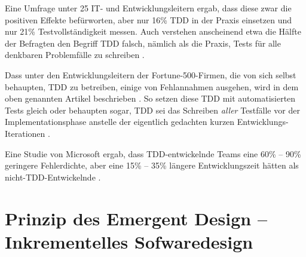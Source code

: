 Eine Umfrage unter 25 IT- und Entwicklungsleitern ergab, dass diese zwar die positiven Effekte befürworten, aber nur 16\% TDD in der Praxis einsetzen und nur 21\% Testvollständigkeit messen. Auch verstehen anscheinend etwa die Hälfte der Befragten den Begriff TDD falsch, nämlich als die Praxis, Tests für alle denkbaren Problemfälle zu schreiben \citep{stelligent_inc_stelligent_2007}.

Dass unter den Entwicklungsleitern der Fortune-500-Firmen, die von sich selbst behaupten, TDD zu betreiben, einige von Fehlannahmen ausgehen, wird in dem oben genannten Artikel beschrieben \citep{janzen_does_2008}. So setzen diese TDD mit automatisierten Tests gleich oder behaupten sogar, TDD sei das Schreiben \textit{aller} Testfälle vor der Implementationsphase anstelle der eigentlich gedachten kurzen Entwicklungs-Iterationen \citep{janzen_does_2008}.


Eine Studie von Microsoft ergab, dass TDD-entwickelnde Teams eine 60\% -- 90\% geringere Fehlerdichte, aber eine 15\% -- 35\% längere Entwicklungszeit hätten als nicht-TDD-Entwickelnde \citep{nagappan_realizing_2008}.



\section{Prinzip des Emergent Design -- Inkrementelles Sofwaredesign}
\label{sec:tddEmergent}





